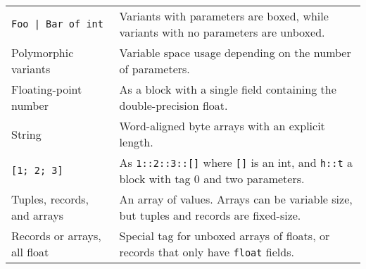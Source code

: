 \begin{longtable}[]{@{}ll@{}}
\begin{minipage}[t]{0.42\columnwidth}\raggedright
\passthrough{\lstinline!Foo | Bar of int!}\strut
\end{minipage} & \begin{minipage}[t]{0.52\columnwidth}\raggedright
Variants with parameters are boxed, while variants with no parameters
are unboxed.\strut
\end{minipage}\tabularnewline
\begin{minipage}[t]{0.42\columnwidth}\raggedright
Polymorphic variants\strut
\end{minipage} & \begin{minipage}[t]{0.52\columnwidth}\raggedright
Variable space usage depending on the number of parameters.\strut
\end{minipage}\tabularnewline
\begin{minipage}[t]{0.42\columnwidth}\raggedright
Floating-point number\strut
\end{minipage} & \begin{minipage}[t]{0.52\columnwidth}\raggedright
As a block with a single field containing the double-precision
float.\strut
\end{minipage}\tabularnewline
\begin{minipage}[t]{0.42\columnwidth}\raggedright
String\strut
\end{minipage} & \begin{minipage}[t]{0.52\columnwidth}\raggedright
Word-aligned byte arrays with an explicit length.\strut
\end{minipage}\tabularnewline
\begin{minipage}[t]{0.42\columnwidth}\raggedright
\passthrough{\lstinline![1; 2; 3]!}\strut
\end{minipage} & \begin{minipage}[t]{0.52\columnwidth}\raggedright
As \passthrough{\lstinline!1::2::3::[]!} where
\passthrough{\lstinline![]!} is an int, and
\passthrough{\lstinline!h::t!} a block with tag 0 and two
parameters.\strut
\end{minipage}\tabularnewline
\begin{minipage}[t]{0.42\columnwidth}\raggedright
Tuples, records, and arrays\strut
\end{minipage} & \begin{minipage}[t]{0.52\columnwidth}\raggedright
An array of values. Arrays can be variable size, but tuples and records
are fixed-size.\strut
\end{minipage}\tabularnewline
\begin{minipage}[t]{0.42\columnwidth}\raggedright
Records or arrays, all float\strut
\end{minipage} & \begin{minipage}[t]{0.52\columnwidth}\raggedright
Special tag for unboxed arrays of floats, or records that only have
\passthrough{\lstinline!float!} fields.\strut
\end{minipage}\tabularnewline
\bottomrule
\end{longtable}

